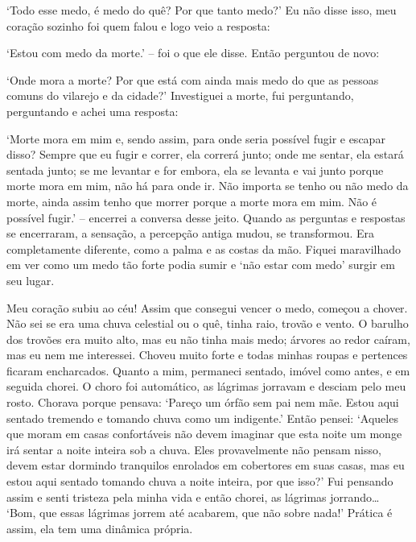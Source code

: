 `Todo esse medo, é medo do quê? Por que tanto medo?' Eu não disse isso,
meu coração sozinho foi quem falou e logo veio a resposta:

`Estou com medo da morte.' -- foi o que ele disse. Então perguntou de
novo:

`Onde mora a morte? Por que está com ainda mais medo do que as pessoas
comuns do vilarejo e da cidade?' Investiguei a morte, fui perguntando,
perguntando e achei uma resposta:

`Morte mora em mim e, sendo assim, para onde seria possível fugir e
escapar disso? Sempre que eu fugir e correr, ela correrá junto; onde me
sentar, ela estará sentada junto; se me levantar e for embora, ela se
levanta e vai junto porque morte mora em mim, não há para onde ir. Não
importa se tenho ou não medo da morte, ainda assim tenho que morrer
porque a morte mora em mim. Não é possível fugir.' -- encerrei a
conversa desse jeito. Quando as perguntas e respostas se encerraram, a
sensação, a percepção antiga mudou, se transformou. Era completamente
diferente, como a palma e as costas da mão. Fiquei maravilhado em ver
como um medo tão forte podia sumir e `não estar com medo' surgir em seu
lugar.

Meu coração subiu ao céu! Assim que consegui vencer o medo, começou a
chover. Não sei se era uma chuva celestial ou o quê, tinha raio, trovão
e vento. O barulho dos trovões era muito alto, mas eu não tinha mais
medo; árvores ao redor caíram, mas eu nem me interessei. Choveu muito
forte e todas minhas roupas e pertences ficaram encharcados. Quanto a
mim, permaneci sentado, imóvel como antes, e em seguida chorei. O choro
foi automático, as lágrimas jorravam e desciam pelo meu rosto. Chorava
porque pensava: `Pareço um órfão sem pai nem mãe. Estou aqui sentado
tremendo e tomando chuva como um indigente.' Então pensei: `Aqueles que
moram em casas confortáveis não devem imaginar que esta noite um monge
irá sentar a noite inteira sob a chuva. Eles provavelmente não pensam
nisso, devem estar dormindo tranquilos enrolados em cobertores em suas
casas, mas eu estou aqui sentado tomando chuva a noite inteira, por que
isso?' Fui pensando assim e senti tristeza pela minha vida e então
chorei, as lágrimas jorrando\ldots{} `Bom, que essas lágrimas jorrem até
acabarem, que não sobre nada!' Prática é assim, ela tem uma dinâmica
própria.

